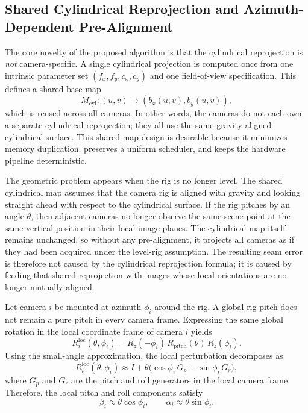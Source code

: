 \documentclass[journal]{IEEEtran}
\begin{document}
\subsection{Shared Cylindrical Reprojection and Azimuth-Dependent Pre-Alignment}
The core novelty of the proposed algorithm is that the cylindrical reprojection is \emph{not} camera-specific. A single cylindrical projection is computed once from one intrinsic parameter set $(f_x,f_y,c_x,c_y)$ and one field-of-view specification. This defines a shared base map
\begin{equation}
M_{\mathrm{cyl}}:(u,v) \mapsto (b_x(u,v), b_y(u,v)),
\label{eq:sharedmap2}
\end{equation}
which is reused across all cameras. In other words, the cameras do not each own a separate cylindrical reprojection; they all use the same gravity-aligned cylindrical surface. This shared-map design is desirable because it minimizes memory duplication, preserves a uniform scheduler, and keeps the hardware pipeline deterministic.

The geometric problem appears when the rig is no longer level. The shared cylindrical map assumes that the camera rig is aligned with gravity and looking straight ahead with respect to the cylindrical surface. If the rig pitches by an angle $\theta$, then adjacent cameras no longer observe the same scene point at the same vertical position in their local image planes. The cylindrical map itself remains unchanged, so without any pre-alignment, it projects all cameras as if they had been acquired under the level-rig assumption. The resulting seam error is therefore not caused by the cylindrical reprojection formula; it is caused by feeding that shared reprojection with images whose local orientations are no longer mutually aligned.

Let camera $i$ be mounted at azimuth $\phi_i$ around the rig. A global rig pitch does not remain a pure pitch in every camera frame. Expressing the same global rotation in the local coordinate frame of camera $i$ yields
\begin{equation}
R_i^{\mathrm{loc}}(\theta,\phi_i)=R_z(-\phi_i)\,R_{\mathrm{pitch}}(\theta)\,R_z(\phi_i).
\label{eq:localrot2}
\end{equation}
Using the small-angle approximation, the local perturbation decomposes as
\begin{equation}
R_i^{\mathrm{loc}}(\theta,\phi_i) \approx I + \theta\big(\cos\phi_i\,G_p + \sin\phi_i\,G_r\big),
\label{eq:generator_decomp2}
\end{equation}
where $G_p$ and $G_r$ are the pitch and roll generators in the local camera frame. Therefore, the local pitch and roll components satisfy
\begin{equation}
\beta_i \approx \theta\cos\phi_i,
\qquad
\alpha_i \approx \theta\sin\phi_i.
\label{eq:alphabeta2}
\end{equation}
\end{document}
